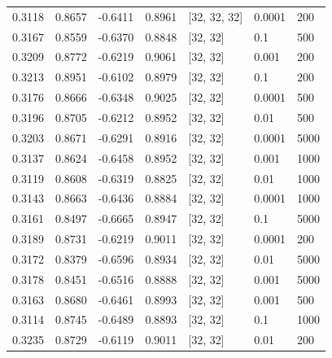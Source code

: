 \begin{tabular}{lllllll}
0.3118 & 0.8657 & -0.6411 & 0.8961 & [32, 32, 32] & 0.0001 & 200 \\
0.3167 & 0.8559 & -0.6370 & 0.8848 & [32, 32] & 0.1 & 500 \\
0.3209 & 0.8772 & -0.6219 & 0.9061 & [32, 32] & 0.001 & 200 \\
0.3213 & 0.8951 & -0.6102 & 0.8979 & [32, 32] & 0.1 & 200 \\
0.3176 & 0.8666 & -0.6348 & 0.9025 & [32, 32] & 0.0001 & 500 \\
0.3196 & 0.8705 & -0.6212 & 0.8952 & [32, 32] & 0.01 & 500 \\
0.3203 & 0.8671 & -0.6291 & 0.8916 & [32, 32] & 0.0001 & 5000 \\
0.3137 & 0.8624 & -0.6458 & 0.8952 & [32, 32] & 0.001 & 1000 \\
0.3119 & 0.8608 & -0.6319 & 0.8825 & [32, 32] & 0.01 & 1000 \\
0.3143 & 0.8663 & -0.6436 & 0.8884 & [32, 32] & 0.0001 & 1000 \\
0.3161 & 0.8497 & -0.6665 & 0.8947 & [32, 32] & 0.1 & 5000 \\
0.3189 & 0.8731 & -0.6219 & 0.9011 & [32, 32] & 0.0001 & 200 \\
0.3172 & 0.8379 & -0.6596 & 0.8934 & [32, 32] & 0.01 & 5000 \\
0.3178 & 0.8451 & -0.6516 & 0.8888 & [32, 32] & 0.001 & 5000 \\
0.3163 & 0.8680 & -0.6461 & 0.8993 & [32, 32] & 0.001 & 500 \\
0.3114 & 0.8745 & -0.6489 & 0.8893 & [32, 32] & 0.1 & 1000 \\
0.3235 & 0.8729 & -0.6119 & 0.9011 & [32, 32] & 0.01 & 200 \\
\bottomrule
\end{tabular}
